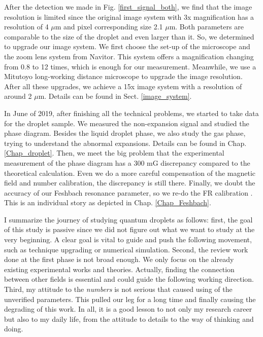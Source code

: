 After the detection we made in Fig. \ref{first_signal_both}, we find that the image resolution is limited since the original image system with 3x magnification has a resolution of 4 $\mu$m and pixel corresponding size 2.1 $\mu$m. Both parameters are comparable to the size of the droplet and even larger than it. So, we determined to upgrade our image system. We first choose the set-up of the microscope and the zoom lens system from Navitor. This system offers a magnification changing from 0.8 to 12 times, which is enough for our measurement. Meanwhile, we use a Mitutoyo long-working distance microscope to upgrade the image resolution. After all these upgrades, we achieve a 15x image system with a resolution of around 2 $\mu$m. Details can be found in Sect. \ref{image_system}.

In June of 2019, after finishing all the technical problems, we started to take data for the droplet sample. We measured the non-expansion signal and studied the phase diagram. Besides the liquid droplet phase, we also study the gas phase, trying to understand the abnormal expansions. Details can be found in Chap. \ref{Chap_droplet}. Then, we meet the big problem that the experimental measurement of the phase diagram has a 300 mG discrepancy compared to the theoretical calculation. Even we do a more careful compensation of the magnetic field and number calibration, the discrepancy is still there. Finally, we doubt the accuracy of our Feshbach resonance parameter, so we re-do the FR calibration \cite{guo2021tunable}. This is an individual story as depicted in Chap. \ref{Chap_Feshbach}.

I summarize the journey of studying quantum droplets as follows: first, the goal of this study is passive since we did not figure out what we want to study at the very beginning. A clear goal is vital to guide and push the following movement, such as technique upgrading or numerical simulation. Second, the review work done at the first phase is not broad enough. We only focus on the already existing experimental works and theories. Actually, finding the connection between other fields is essential and could guide the following working direction. Third, my attitude to the \textit{numbers} is not serious that caused using of the unverified parameters. This pulled our leg for a long time and finally causing the degrading of this work. In all, it is a good lesson to not only my research career but also to my daily life, from the attitude to details to the way of thinking and doing.

